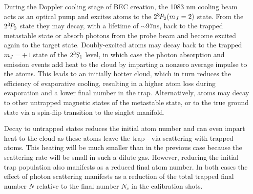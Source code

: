 	During the Doppler cooling stage of BEC creation, the 1083 nm cooling beam acts as an optical pump and excites atoms to the $2^{3\!} P_2(m_J=2)$ state.
	From the $2^{3\!} P_2$ state they may decay, with a lifetime of $\sim$97ns, back to the trapped metastable state or absorb photons from the probe beam and become excited again to the target state.
	Doubly-excited atoms may decay back to the trapped $m_J=+1$ state of the $2^{3\!} S_1$ level, in which case the photon absorption and emission events add heat to the cloud by imparting a nonzero average impulse to the atoms.
	This leads to an initially hotter cloud, which in turn reduces the efficiency of evaporative cooling, resulting in a higher atom loss during evaporation and a lower final number in the trap. Alternatively, atoms may decay to other untrapped magnetic states of the metastable state, or to the true ground state via a spin-flip transition to the singlet manifold.

	Decay to untrapped states reduces the initial atom number and can even impart heat to the cloud as these atoms leave the trap - via scattering with trapped atoms.
	This heating will be much smaller than in the previous case because the scattering rate will be small in such a dilute gas.
	However, reducing the initial trap population also manifests as a reduced final atom number.
	In both cases the effect of photon scattering manifests as a reduction of the total trapped final number $N$ relative to the final number $N_c$ in the calibration shots.

